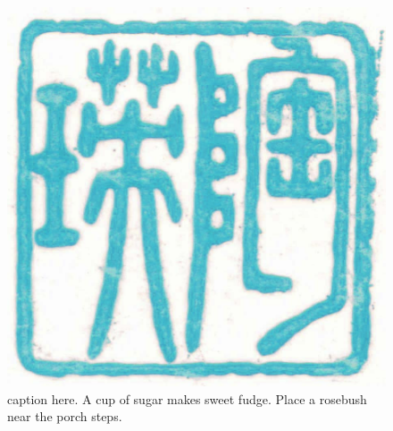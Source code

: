 \documentclass[
  letterpaper,
  DIV=11,
  numbers=noendperiod]{scrartcl}
\begin{document}
\begin{figure}
\centering
\includegraphics[width=0.7\linewidth]{stamp1b.jpg}
\caption{caption here. A cup of sugar makes sweet fudge. Place a rosebush near the porch steps.}
\vspace{-3pt}
\end{figure}
\end{document}
